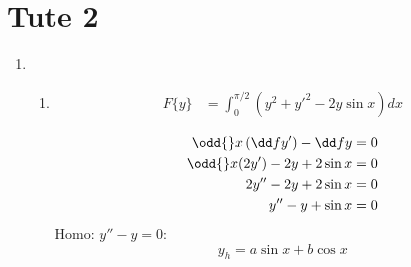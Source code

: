 \documentclass{X:/Documents/Coding/Latex/myassignment}
\begin{document}
\section{Tute 2}
\begin{enumerate}
	\item 
	\begin{enumerate}
		\item 
		\begin{align*}
			F\{y\} &= \int_0^{\pi/2} (y^2 + y'^2 - 2y\sin x) dx 
		\end{align*}
		
		\begin{align*}
			\odd{}x\left(\dd f{y'}\right) - \dd f{y} =0\\
			\odd{}x(2y') - 2y + 2\sin x = 0\\
			2y'' - 2y + 2\sin x = 0\\
			y'' - y + \sin x = 0\\
		\end{align*}
		Homo:
		$y'' - y = 0$:
		\[y_h = a\sin x + b\cos x \]


\end{enumerate}
\end{enumerate}
\end{document}
